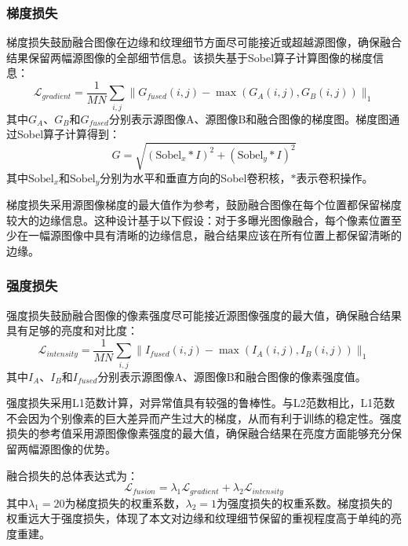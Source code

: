 \subsubsection{梯度损失}\label{sec:gradient_loss}

梯度损失鼓励融合图像在边缘和纹理细节方面尽可能接近或超越源图像，确保融合结果保留两幅源图像的全部细节信息。该损失基于Sobel算子计算图像的梯度信息：
\begin{equation}
    \mathcal{L}_{gradient} = \frac{1}{MN}\sum_{i,j} \|G_{fused}(i,j) - \max(G_A(i,j), G_B(i,j))\|_1
\end{equation}
其中$G_A$、$G_B$和$G_{fused}$分别表示源图像A、源图像B和融合图像的梯度图。梯度图通过Sobel算子计算得到：
\begin{equation}
    G = \sqrt{(\text{Sobel}_x * I)^2 + (\text{Sobel}_y * I)^2}
\end{equation}
其中$\text{Sobel}_x$和$\text{Sobel}_y$分别为水平和垂直方向的Sobel卷积核，$*$表示卷积操作。

梯度损失采用源图像梯度的最大值作为参考，鼓励融合图像在每个位置都保留梯度较大的边缘信息。这种设计基于以下假设：对于多曝光图像融合，每个像素位置至少在一幅源图像中具有清晰的边缘信息，融合结果应该在所有位置上都保留清晰的边缘。

\subsubsection{强度损失}\label{sec:intensity_loss}

强度损失鼓励融合图像的像素强度尽可能接近源图像强度的最大值，确保融合结果具有足够的亮度和对比度：
\begin{equation}
    \mathcal{L}_{intensity} = \frac{1}{MN}\sum_{i,j} \|I_{fused}(i,j) - \max(I_A(i,j), I_B(i,j))\|_1
\end{equation}
其中$I_A$、$I_B$和$I_{fused}$分别表示源图像A、源图像B和融合图像的像素强度值。

强度损失采用L1范数计算，对异常值具有较强的鲁棒性。与L2范数相比，L1范数不会因为个别像素的巨大差异而产生过大的梯度，从而有利于训练的稳定性。强度损失的参考值采用源图像像素强度的最大值，确保融合结果在亮度方面能够充分保留两幅源图像的优势。

融合损失的总体表达式为：
\begin{equation}
    \mathcal{L}_{fusion} = \lambda_1 \mathcal{L}_{gradient} + \lambda_2 \mathcal{L}_{intensity}
\end{equation}
其中$\lambda_1 = 20$为梯度损失的权重系数，$\lambda_2 = 1$为强度损失的权重系数。梯度损失的权重远大于强度损失，体现了本文对边缘和纹理细节保留的重视程度高于单纯的亮度重建。


